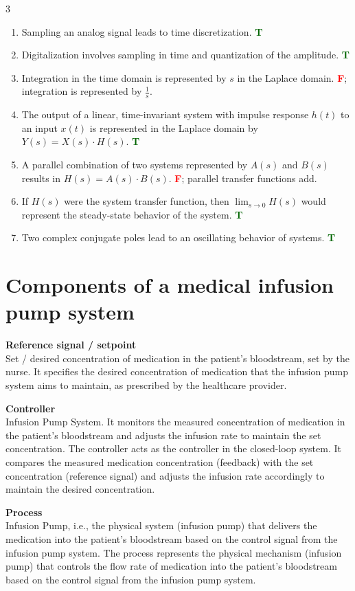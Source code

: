 \documentclass[9pt, landscape, a4paper]{article}
\begin{document}
\begin{multicols*}{3}
\begin{enumerate}[leftmargin=*, itemsep=2pt, parsep=1pt]
    \item Sampling an analog signal leads to time discretization. \textbf{\textcolor{darkgreen}{T}}
    \item Digitalization involves sampling in time and quantization of the amplitude. \textbf{\textcolor{darkgreen}{T}}
    \item Integration in the time domain is represented by $s$ in the Laplace domain. \textbf{\textcolor{red}{F}}; integration is represented by $\frac{1}{s}$.
    \item The output of a linear, time-invariant system with impulse response $h(t)$ to an input $x(t)$ is represented in the Laplace domain by $Y(s)=X(s)\cdot H(s)$. \textbf{\textcolor{darkgreen}{T}}
    \item A parallel combination of two systems represented by $A(s)$ and $B(s)$ results in $H(s)=A(s)\cdot B(s)$. \textbf{\textcolor{red}{F}}; parallel transfer functions add.
    \item If $H(s)$ were the system transfer function, then $\lim_{s\to 0}H(s)$ would represent the steady-state behavior of the system. \textbf{\textcolor{darkgreen}{T}}
    \item Two complex conjugate poles lead to an oscillating behavior of systems. \textbf{\textcolor{darkgreen}{T}}
\end{enumerate}

\section{Components of a medical infusion pump system}
\tiny
\textbf{Reference signal / setpoint}\\
Set / desired concentration of medication in the patient's bloodstream, set by the nurse. It
specifies the desired concentration of medication that the infusion pump system aims to
maintain, as prescribed by the healthcare provider.

\textbf{Controller}\\
Infusion Pump System. It monitors the measured concentration of medication in the patient's
bloodstream and adjusts the infusion rate to maintain the set concentration. The controller
acts as the controller in the closed-loop system. It compares the measured medication
concentration (feedback) with the set concentration (reference signal) and adjusts the
infusion rate accordingly to maintain the desired concentration.

\textbf{Process}\\
Infusion Pump, i.e., the physical system (infusion pump) that delivers the medication into
the patient's bloodstream based on the control signal from the infusion pump system. The
process represents the physical mechanism (infusion pump) that controls the flow rate of
medication into the patient's bloodstream based on the control signal from the infusion pump
system.


\end{multicols*}
\end{document}
